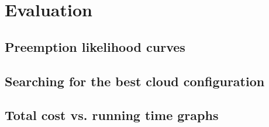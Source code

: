 \section{Evaluation}

\subsection{Preemption likelihood curves}

\subsection{Searching for the best cloud configuration}

\subsection{Total cost vs. running time graphs}


